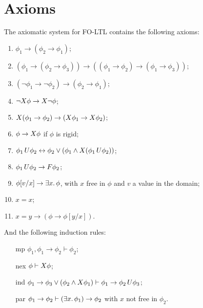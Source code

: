 \section{Axioms}
\begin{definition}\label{def:axioms}
  The axiomatic system for FO-LTL contains the following axioms:
  \begin{enumerate}
    \item $\phi_1 \to (\phi_2 \to \phi_1)$;
    \item $(\phi_1 \to (\phi_2 \to \phi_3)) \to ((\phi_1 \to \phi_2) \to (\phi_1 \to \phi_3))$;
    \item $(\neg\phi_1 \to \neg\phi_2) \to (\phi_2 \to \phi_1)$;
    \item $\neg X{\phi} \to X{\neg\phi}$;
    \item $X{(\phi_1 \to \phi_2)} \to (X{\phi_1} \to X{\phi_2})$;
    \item $\phi \to X{\phi}$ if $\phi$ is rigid;
    \item ${\phi_1}\,U {\phi_2} \leftrightarrow \phi_2 \lor (\phi_1 \land X{({\phi_1}\,U {\phi_2})})$;
    \item ${\phi_1}\,U {\phi_2} \to F{\phi_2}$;
    \item $\phi[v/x] \to \exists {x} \ldotp {\phi}$, with $x$ free in $\phi$ and $v$ a value in the domain;
    \item $x = x$;
    \item $x = y \to (\phi \to \phi[y/x])$.
  \end{enumerate}
  And the following induction rules:
  \begin{enumerate}
    \item[mp] $\phi_1, \phi_1 \to \phi_2 \vdash \phi_2$;
    \item[nex] $\phi \vdash X{\phi}$;
    \item[ind] $\phi_1 \to \phi_3 \lor (\phi_2 \land X{\phi_1}) \vdash \phi_1 \to {\phi_2}\,U {\phi_3}$;
    \item[par] $\phi_1 \to \phi_2 \vdash (\exists {x} \ldotp {\phi_1}) \to \phi_2$ with $x$ not free in $\phi_2$.
  \end{enumerate}
\end{definition}

